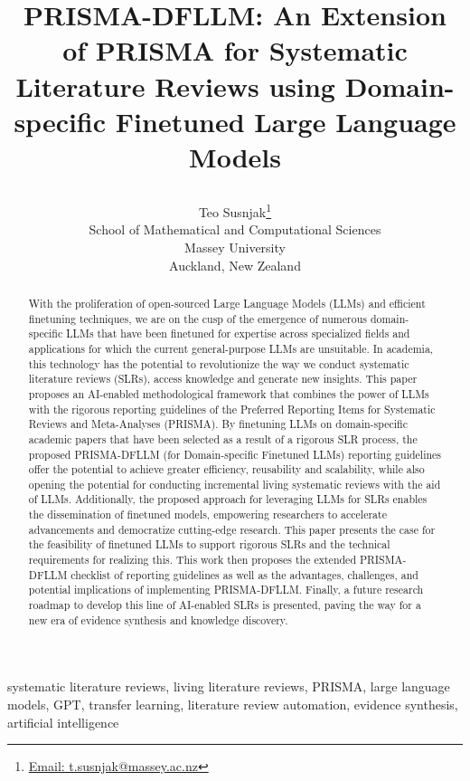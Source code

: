 \documentclass{article}
\title{PRISMA-DFLLM: An Extension of PRISMA for Systematic Literature Reviews using Domain-specific Finetuned Large Language Models


}
\author{
  Teo Susnjak\footnote{\href{mailto:t.susnjak@massey.ac.nz}{Email: t.susnjak@massey.ac.nz}} \\
  School of Mathematical and Computational Sciences \\
  Massey University \\
  Auckland, New Zealand \\
}
\begin{document}
\maketitle

\begin{abstract}
With the proliferation of open-sourced Large Language Models (LLMs) and efficient finetuning techniques, we are on the cusp of the emergence of numerous domain-specific LLMs that have been finetuned for expertise across specialized fields and applications for which the current general-purpose LLMs are unsuitable. In academia, this technology has the potential to revolutionize the way we conduct systematic literature reviews (SLRs), access knowledge and generate new insights. This paper proposes an AI-enabled methodological framework that combines the power of LLMs with the rigorous reporting guidelines of the Preferred Reporting Items for Systematic Reviews and Meta-Analyses (PRISMA). By finetuning LLMs on domain-specific academic papers that have been selected as a result of a rigorous SLR process, the proposed PRISMA-DFLLM (for Domain-specific Finetuned LLMs) reporting guidelines offer the potential to achieve greater efficiency, reusability and scalability, while also opening the potential for conducting incremental living systematic reviews with the aid of LLMs. Additionally, the proposed approach for leveraging LLMs for SLRs enables the dissemination of finetuned models, empowering researchers to accelerate advancements and democratize cutting-edge research. This paper presents the case for the feasibility of finetuned LLMs to support rigorous SLRs and the technical requirements for realizing this. This work then proposes the extended PRISMA-DFLLM checklist of reporting guidelines as well as the advantages, challenges, and potential implications of implementing PRISMA-DFLLM. Finally, a future research roadmap to develop this line of AI-enabled SLRs is presented, paving the way for a new era of evidence synthesis and knowledge discovery.\end{abstract}

\begin{keywords}  {systematic literature reviews, living literature reviews, PRISMA, large language models, GPT, transfer learning, literature review automation, evidence synthesis, artificial intelligence}  
\end{keywords}

\end{document}
